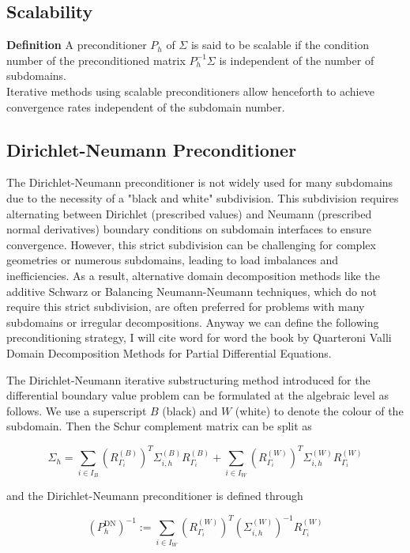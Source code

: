 \documentclass[11pt]{book}
\begin{document}
\subsection*{Scalability}
\textbf{Definition}
A preconditioner $P_{h}$ of $\Sigma$ is said to be scalable if the condition number of the preconditioned matrix $P_{h}^{-1} \Sigma$ is independent of the number of subdomains. \\

Iterative methods using scalable preconditioners allow henceforth to achieve convergence rates independent of the subdomain number.

\subsection*{Dirichlet-Neumann Preconditioner}
The Dirichlet-Neumann preconditioner is not widely used for many subdomains due to the necessity of a "black and white" subdivision. This subdivision requires alternating between Dirichlet (prescribed values) and Neumann (prescribed normal derivatives) boundary conditions on subdomain interfaces to ensure convergence. However, this strict subdivision can be challenging for complex geometries or numerous subdomains, leading to load imbalances and inefficiencies. As a result, alternative domain decomposition methods like the additive Schwarz or Balancing Neumann-Neumann techniques, which do not require this strict subdivision, are often preferred for problems with many subdomains or irregular decompositions. Anyway we can define the following preconditioning strategy, I will cite word for word the book by Quarteroni Valli Domain Decomposition Methods for Partial Differential Equations.

The Dirichlet-Neumann iterative substructuring method introduced for the differential boundary value problem  can be formulated at the algebraic level as follows. We use a superscript $B$ (black) and $W$ (white) to denote the colour of the subdomain. Then the Schur complement
matrix can be split as

$$
\Sigma_{h}=\sum_{i \in I_{B}}\left(R_{\Gamma_{i}}^{(B)}\right)^{T} \Sigma_{i, h}^{(B)} R_{\Gamma_{i}}^{(B)}+\sum_{i \in I_{W}}\left(R_{\Gamma_{i}}^{(W)}\right)^{T} \Sigma_{i, h}^{(W)} R_{\Gamma_{i}}^{(W)}
$$

and the Dirichlet-Neumann preconditioner is defined through

$$
\left(P_{h}^{\mathrm{DN}}\right)^{-1}:=\sum_{i \in I_{W}}\left(R_{\Gamma_{i}}^{(W)}\right)^{T}\left(\Sigma_{i, h}^{(W)}\right)^{-1} R_{\Gamma_{i}}^{(W)}
$$
\end{document}
